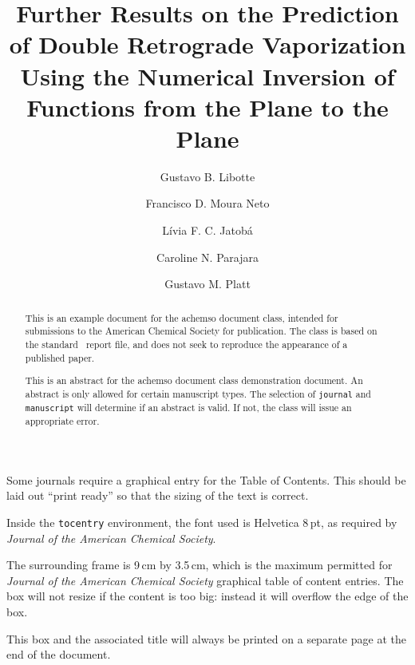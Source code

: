 \documentclass[journal=iecred,manuscript=article]{achemso}
\author{Gustavo B. Libotte}
\author{Francisco D. Moura Neto}
\author{L\'{i}via F. C. Jatob\'{a}}
\author{Caroline N. Parajara}
\author{Gustavo M. Platt}
\affiliation[Unknown University]
{Polytechnic Institute, Rio de Janeiro State University, Nova Friburgo, Brazil}
\title[An \textsf{achemso} demo]
  {Further Results on the Prediction of Double Retrograde Vaporization Using the Numerical Inversion of Functions from the Plane to the Plane}
\theoremstyle{definition}
\theoremstyle{remark}
\begin{document}
\begin{tocentry}

Some journals require a graphical entry for the Table of Contents.
This should be laid out ``print ready'' so that the sizing of the
text is correct.

Inside the \texttt{tocentry} environment, the font used is Helvetica
8\,pt, as required by \emph{Journal of the American Chemical
Society}.

The surrounding frame is 9\,cm by 3.5\,cm, which is the maximum
permitted for  \emph{Journal of the American Chemical Society}
graphical table of content entries. The box will not resize if the
content is too big: instead it will overflow the edge of the box.

This box and the associated title will always be printed on a
separate page at the end of the document.

\end{tocentry}

\begin{abstract}
  This is an example document for the \textsf{achemso} document
  class, intended for submissions to the American Chemical Society
  for publication. The class is based on the standard \LaTeXe\
  \textsf{report} file, and does not seek to reproduce the appearance
  of a published paper.

  This is an abstract for the \textsf{achemso} document class
  demonstration document.  An abstract is only allowed for certain
  manuscript types.  The selection of \texttt{journal} and
  \texttt{manuscript} will determine if an abstract is valid.  If
  not, the class will issue an appropriate error.
\end{abstract}

\end{document}
